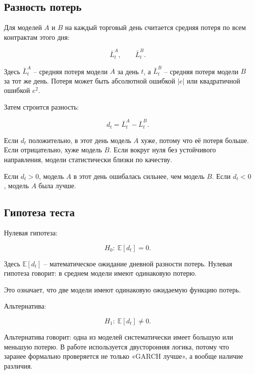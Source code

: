 \documentclass[11pt,a4paper]{article}
\begin{document}
\subsection{Разность потерь}

Для моделей $A$ и $B$ на каждый торговый день считается средняя потеря по всем контрактам этого дня:

\begin{equation}
\bar L^A_t,
\qquad
\bar L^B_t.
\end{equation}

Здесь $\bar L^A_t$ -- средняя потеря модели $A$ за день $t$, а $\bar L^B_t$ -- средняя потеря модели $B$ за тот же день. Потеря может быть абсолютной ошибкой $|e|$ или квадратичной ошибкой $e^2$.

Затем строится разность:

\begin{equation}
d_t=\bar L^A_t-\bar L^B_t.
\end{equation}

Если $d_t$ положительно, в этот день модель $A$ хуже, потому что её потеря больше. Если отрицательно, хуже модель $B$. Если вокруг нуля без устойчивого направления, модели статистически близки по качеству.

Если $d_t>0$, модель $A$ в этот день ошибалась сильнее, чем модель $B$. Если $d_t<0$, модель $A$ была лучше.

\subsection{Гипотеза теста}

Нулевая гипотеза:

\begin{equation}
H_0:\ \mathbb{E}[d_t]=0.
\end{equation}

Здесь $\mathbb{E}[d_t]$ -- математическое ожидание дневной разности потерь. Нулевая гипотеза говорит: в среднем модели имеют одинаковую потерю.

Это означает, что две модели имеют одинаковую ожидаемую функцию потерь.

Альтернатива:

\begin{equation}
H_1:\ \mathbb{E}[d_t]\neq 0.
\end{equation}

Альтернатива говорит: одна из моделей систематически имеет большую или меньшую потерю. В работе используется двусторонняя логика, потому что заранее формально проверяется не только «GARCH лучше», а вообще наличие различия.
\end{document}

